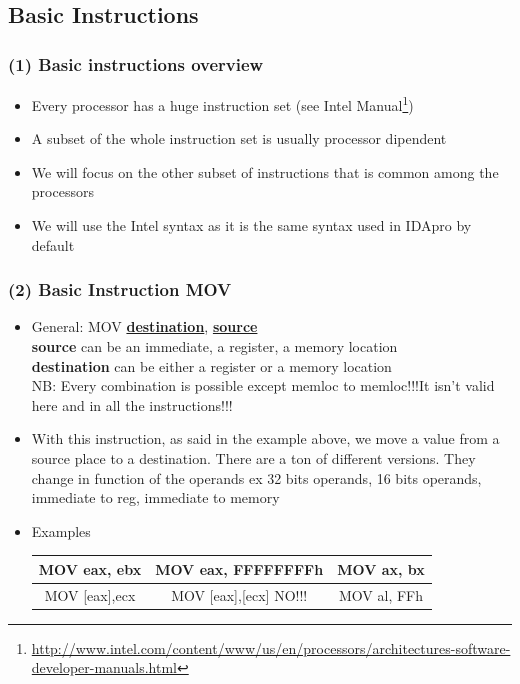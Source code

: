 \documentclass[]{beamer}
\begin{document}
	\subsection{Basic Instructions}
		\begin{frame}
			\frametitle{(1) Basic instructions overview}
				\begin{itemize}
					\item{Every processor has a huge instruction set (see Intel Manual\footnote{\url{http://www.intel.com/content/www/us/en/processors/architectures-software-developer-manuals.html}})}
					\item{A subset of the whole instruction set is usually processor dipendent}
					\item{We will focus on the other subset of instructions that is common among the processors}
					\item{We will use the Intel syntax as it is the same syntax used in IDApro by default}
				\end{itemize}
		\end{frame}
		\begin{frame}
			\frametitle{(2) Basic Instruction MOV}
				\begin{itemize}	
					\item{ General: MOV \underline{\textbf{destination}}, \underline{\textbf{source}}}\\
					\textbf{source} can be an immediate, a register, a memory location\\
					\textbf{destination} can be either a register  or a memory location\\
					NB: Every combination is possible except memloc to memloc!!!It isn't valid here and in all the instructions!!!

					\item{With this instruction, as said in the example above, we move a value from a source place to a destination. There are a ton of different versions. They change in function of the operands ex 32 bits operands, 16 bits operands, immediate to reg, immediate to memory }
				\item{Examples}
					\begin{table}[h]
						\begin{tabular}{|c|c|c|}
							\hline
							MOV eax, ebx&MOV eax, FFFFFFFFh &MOV ax, bx\\    \hline
							MOV [eax],ecx&MOV [eax],[ecx] \color{red}NO!!!&MOV al, FFh\\
							\hline
						\end{tabular}
					\end{table}
			\end{itemize}	

		\end{frame}
\end{document}
